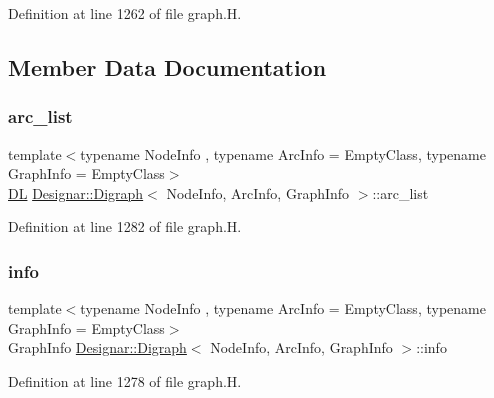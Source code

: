 Definition at line 1262 of file graph.\+H.



\subsection{Member Data Documentation}
\mbox{\label{class_designar_1_1_digraph_ad860dbe9732bc90906a486cad390637a}} 
\subsubsection{\texorpdfstring{arc\+\_\+list}{arc\_list}}
{\footnotesize\ttfamily template$<$typename Node\+Info , typename Arc\+Info  = Empty\+Class, typename Graph\+Info  = Empty\+Class$>$ \\
\hyperlink{class_designar_1_1_d_l}{DL} \hyperlink{class_designar_1_1_digraph}{Designar\+::\+Digraph}$<$ Node\+Info, Arc\+Info, Graph\+Info $>$\+::arc\+\_\+list\hspace{0.3cm}{\ttfamily [protected]}}



Definition at line 1282 of file graph.\+H.

\mbox{\label{class_designar_1_1_digraph_aec655bb1b26775cb7ad3581240290efe}} 
\subsubsection{\texorpdfstring{info}{info}}
{\footnotesize\ttfamily template$<$typename Node\+Info , typename Arc\+Info  = Empty\+Class, typename Graph\+Info  = Empty\+Class$>$ \\
Graph\+Info \hyperlink{class_designar_1_1_digraph}{Designar\+::\+Digraph}$<$ Node\+Info, Arc\+Info, Graph\+Info $>$\+::info\hspace{0.3cm}{\ttfamily [protected]}}



Definition at line 1278 of file graph.\+H.

\mbox{\label{class_designar_1_1_digraph_ac81c264dab34ca74fc62b0693c1c3543}} 
